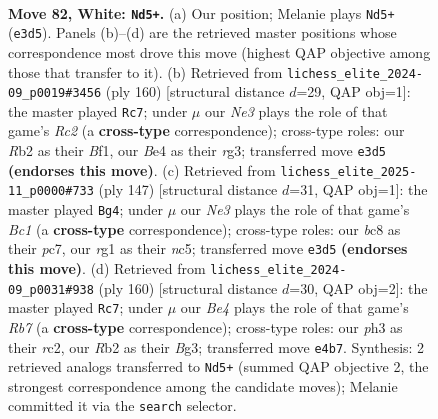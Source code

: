 \documentclass[11pt]{article}
\begin{document}
\clearpage

\begin{figure}[p]\centering
\begin{subfigure}{0.46\textwidth}\centering
\resizebox{\linewidth}{!}{%
\newchessgame
\chessboard[
  setfen={1Bb5/8/5k2/1P6/P3B3/2K1N2p/1R6/6r1 w - - 3 82},
  showmover=false,
  pgfstyle=straightmove, color=movearrow, markmove={e3-d5}
]}
\caption{}
\end{subfigure}\hfill
\begin{subfigure}{0.46\textwidth}\centering
\resizebox{\linewidth}{!}{%
\newchessgame
\chessboard[
  setfen={5k2/8/8/p4K2/P4P1p/6r1/2R5/4bB2 w - - 6 81},
  showmover=false,
  pgfstyle=straightmove, color=movearrow, markmove={c2-c7}
]}
\caption{}
\end{subfigure}
\\[4pt]
\begin{subfigure}{0.46\textwidth}\centering
\resizebox{\linewidth}{!}{%
\newchessgame
\chessboard[
  setfen={2b5/2P5/1P3kp1/2N4p/3K1B2/8/8/8 b - - 0 74},
  showmover=false,
  pgfstyle=straightmove, color=movearrow, markmove={c8-g4}
]}
\caption{}
\end{subfigure}\hfill
\begin{subfigure}{0.46\textwidth}\centering
\resizebox{\linewidth}{!}{%
\newchessgame
\chessboard[
  setfen={8/1R6/p5Pb/P7/4k1K1/6B1/2r5/8 w - - 15 81},
  showmover=false,
  pgfstyle=straightmove, color=movearrow, markmove={b7-c7}
]}
\caption{}
\end{subfigure}
\caption{\textbf{Move 82, White: \texttt{Nd5+}.} (a) Our position; Melanie plays \texttt{Nd5+} (\texttt{e3d5}). Panels (b)--(d) are the retrieved master positions whose correspondence most drove this move (highest QAP objective among those that transfer to it). (b) Retrieved from \texttt{lichess\_elite\_2024-09\_p0019\#3456} (ply 160) [structural distance $d$=29, QAP obj=1]: the master played \texttt{Rc7}; under $\mu$ our \emph{Ne3} plays the role of that game's \emph{Rc2} (a \textbf{cross-type} correspondence); cross-type roles: our \emph{R}b2 as their \emph{B}f1, our \emph{B}e4 as their \emph{r}g3; transferred move \texttt{e3d5} \textbf{(endorses this move)}. (c) Retrieved from \texttt{lichess\_elite\_2025-11\_p0000\#733} (ply 147) [structural distance $d$=31, QAP obj=1]: the master played \texttt{Bg4}; under $\mu$ our \emph{Ne3} plays the role of that game's \emph{Bc1} (a \textbf{cross-type} correspondence); cross-type roles: our \emph{b}c8 as their \emph{p}c7, our \emph{r}g1 as their \emph{n}c5; transferred move \texttt{e3d5} \textbf{(endorses this move)}. (d) Retrieved from \texttt{lichess\_elite\_2024-09\_p0031\#938} (ply 160) [structural distance $d$=30, QAP obj=2]: the master played \texttt{Rc7}; under $\mu$ our \emph{Be4} plays the role of that game's \emph{Rb7} (a \textbf{cross-type} correspondence); cross-type roles: our \emph{p}h3 as their \emph{r}c2, our \emph{R}b2 as their \emph{B}g3; transferred move \texttt{e4b7}. Synthesis: 2 retrieved analogs transferred to \texttt{Nd5+} (summed QAP objective 2, the strongest correspondence among the candidate moves); Melanie committed it via the \texttt{search} selector.}
\label{fig:thought-m162}
\end{figure}
\end{document}
